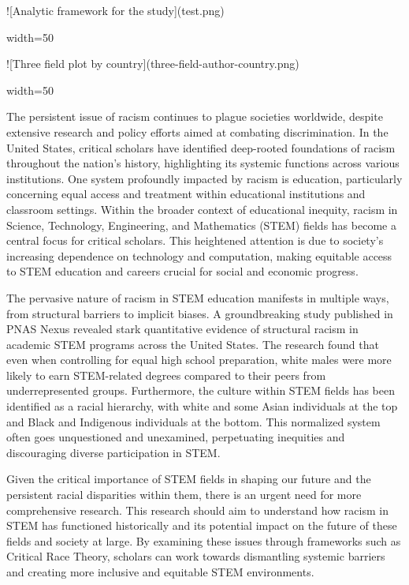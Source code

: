 ![Analytic framework for the study](test.png){width=50%


![Three field plot by country](three-field-author-country.png){width=50%






The persistent issue of racism continues to plague societies worldwide, despite extensive research and policy efforts aimed at combating discrimination. In the United States, critical scholars have identified deep-rooted foundations of racism throughout the nation's history, highlighting its systemic functions across various institutions. One system profoundly impacted by racism is education, particularly concerning equal access and treatment within educational institutions and classroom settings. Within the broader context of educational inequity, racism in Science, Technology, Engineering, and Mathematics (STEM) fields has become a central focus for critical scholars. This heightened attention is due to society's increasing dependence on technology and computation, making equitable access to STEM education and careers crucial for social and economic progress.

The pervasive nature of racism in STEM education manifests in multiple ways, from structural barriers to implicit biases. A groundbreaking study published in PNAS Nexus revealed stark quantitative evidence of structural racism in academic STEM programs across the United States. The research found that even when controlling for equal high school preparation, white males were more likely to earn STEM-related degrees compared to their peers from underrepresented groups. Furthermore, the culture within STEM fields has been identified as a racial hierarchy, with white and some Asian individuals at the top and Black and Indigenous individuals at the bottom. This normalized system often goes unquestioned and unexamined, perpetuating inequities and discouraging diverse participation in STEM.

Given the critical importance of STEM fields in shaping our future and the persistent racial disparities within them, there is an urgent need for more comprehensive research. This research should aim to understand how racism in STEM has functioned historically and its potential impact on the future of these fields and society at large. By examining these issues through frameworks such as Critical Race Theory, scholars can work towards dismantling systemic barriers and creating more inclusive and equitable STEM environments.

}}
